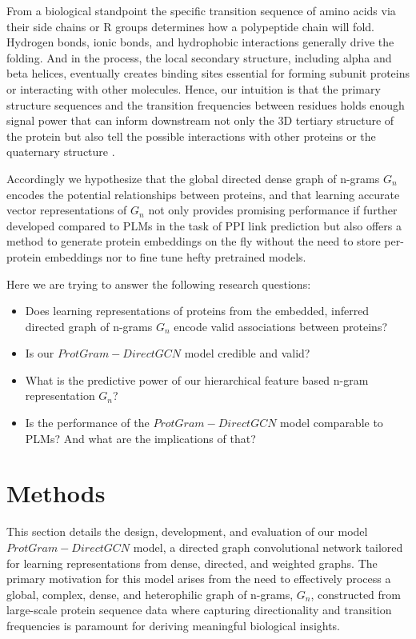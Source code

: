 \documentclass[utf8]{FrontiersinHarvard}
\begin{document}
	From a biological standpoint the specific transition sequence of amino acids via their side chains or R groups determines how a polypeptide chain will fold. Hydrogen bonds, ionic bonds, and hydrophobic interactions generally drive the folding. And in the process, the local secondary structure, including alpha and beta helices, eventually creates binding sites essential for forming subunit proteins or interacting with other molecules. Hence, our intuition is that the primary structure sequences and the transition frequencies between residues holds enough signal power that can inform downstream not only the 3D tertiary structure of the protein but also tell the possible interactions with other proteins or the quaternary structure \cite{dill_proteinfoldingproblem50_2012} \cite{perkins_transientproteinproteininteractions_2010} \cite{anfinsen_principlesthatgovern_1973}.
	
	Accordingly we hypothesize that the global directed dense graph of n-grams $G_{n}$ encodes the potential relationships between proteins, and that learning accurate vector representations of $G_{n}$ not only provides promising performance if further developed compared to PLMs in the task of PPI link prediction but also offers a method to generate protein embeddings on the fly without the need to store per-protein embeddings nor to fine tune hefty pretrained models.
	
	Here we are trying to answer the following research questions:
	\begin{itemize}
		\item Does learning representations of proteins from the embedded, inferred directed graph of n-grams $G_{n}$ encode valid associations between proteins? 
		\item Is our $ProtGram-DirectGCN$ model credible and valid?
		\item What is the predictive power of our hierarchical feature based n-gram representation $G_{n}$?
		\item Is the performance of the $ProtGram-DirectGCN$ model comparable to PLMs? And what are the implications of that?
	\end{itemize}
	
	\section{Methods}
	This section details the design, development, and evaluation of our model $ProtGram-DirectGCN$ model, a directed graph convolutional network tailored for learning representations from dense, directed, and weighted graphs. The primary motivation for this model arises from the need to effectively process a global, complex, dense, and heterophilic graph of n-grams, $G_{n}$, constructed from large-scale protein sequence data where capturing directionality and transition frequencies is paramount for deriving meaningful biological insights.
	
\end{document}
